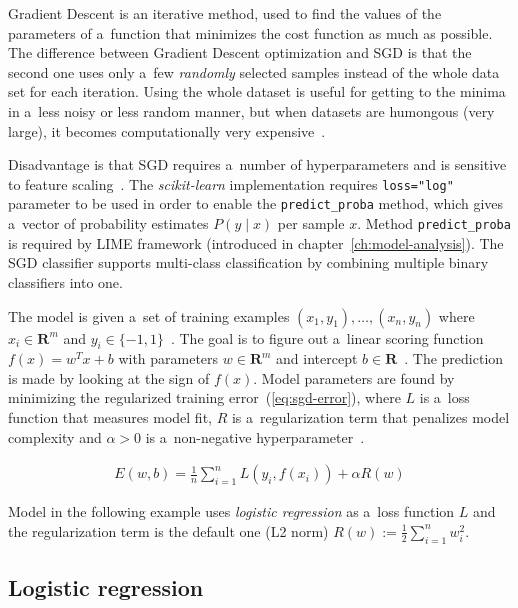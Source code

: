 Gradient Descent is an iterative method, used to find the values of the parameters of a~function that minimizes the cost function as much as possible.
The difference between Gradient Descent optimization and SGD is that the second one uses only a~few \textit{randomly} selected samples instead of the whole data set for each iteration.
Using the whole dataset is useful for getting to the minima in a~less noisy or less random manner, but when datasets are humongous (very large), it becomes computationally very expensive~\cite{web:stochastic-gradient-descent}.

Disadvantage is that SGD requires a~number of hyperparameters and is sensitive to feature scaling~\cite{scikit-learn}.
The \textit{scikit-learn} implementation requires \verb|loss="log"| parameter to be used in order to enable the \verb|predict_proba| method, which gives a~vector of probability estimates \( P(y{\mid}x) \) per sample \( x \).
Method \verb|predict_proba| is required by LIME framework (introduced in chapter~\ref{ch:model-analysis}).
The SGD classifier supports multi-class classification by combining multiple binary classifiers into one.

The model is given a~set of training examples \( (x_1, y_1), \ldots, (x_n, y_n) \) where \( x_i \in \mathbf{R}^m \) and \( y_i \in \{-1,1\} \)~\cite{scikit-learn}.
The goal is to figure out a~linear scoring function \( f(x) = w^T x + b \) with parameters \( w \in \mathbf{R}^m \) and intercept \( b \in \mathbf{R} \)~\cite{scikit-learn}.
The prediction is made by looking at the sign of \( f(x) \).
Model parameters are found by minimizing the regularized training error~(\ref{eq:sgd-error}), where \( L \) is a~loss function that measures model fit, \( R \) is a~regularization term that penalizes model complexity and \( \alpha > 0\) is a~non-negative hyperparameter~\cite{scikit-learn}.

\begin{align}
    E(w,b) = \frac{1}{n}\sum_{i=1}^{n} L(y_i, f(x_i)) + \alpha R(w) \label{eq:sgd-error}
\end{align}

Model in the following example uses \textit{logistic regression} as a~loss function \( L \) and the regularization term is the default one (L2 norm) \( R(w) := \frac{1}{2} \sum_{i=1}^{n} w_i^2 \).

\subsection{Logistic regression}\label{subsec:logistic-regression}

